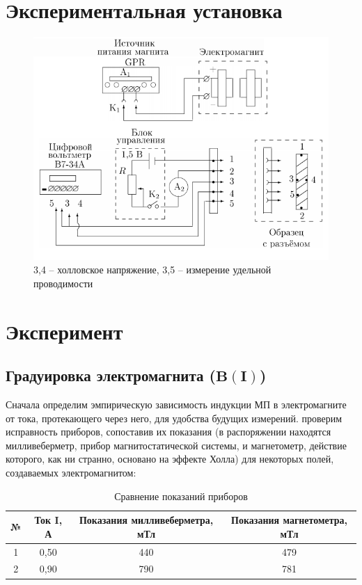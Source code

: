 \documentclass[a4paper, 12pt]{article}
\begin{document}
{\section*{Экспериментальная установка}

\begin{figure}[H]
\centering
\includegraphics[scale=0.5]{1}
\caption{3,4 -- холловское напряжение, 3,5 -- измерение удельной проводимости}
\end{figure}

\section*{Эксперимент}
\subsection*{Градуировка электромагнита ($\mathbf{B(I)}$)}
Сначала определим эмпирическую зависимость индукции МП в электромагните от тока, протекающего через него, для удобства будущих измерений.
проверим исправность приборов, сопоставив их показания (в распоряжении находятся милливеберметр, прибор магнитостатической системы, и магнетометр, действие которого, как ни странно, основано на эффекте Холла) для некоторых полей, создаваемых электромагнитом:

\begin{table}[H]
\centering
\begin{tabular}{|c|c|c|c|}
\hline 
\textbf{№} & \textbf{Ток $\mathbf{I}$, А} & \textbf{Показания милливеберметра, мТл} & \textbf{Показания магнетометра, мТл} \\ 
\hline 
1 & 0,50 & 440 & 479 \\ 
\hline 
2 & 0,90 & 790 & 781 \\ 
\hline 
\end{tabular} 
\caption{Сравнение показаний приборов}
\end{table}

}
\end{document}
